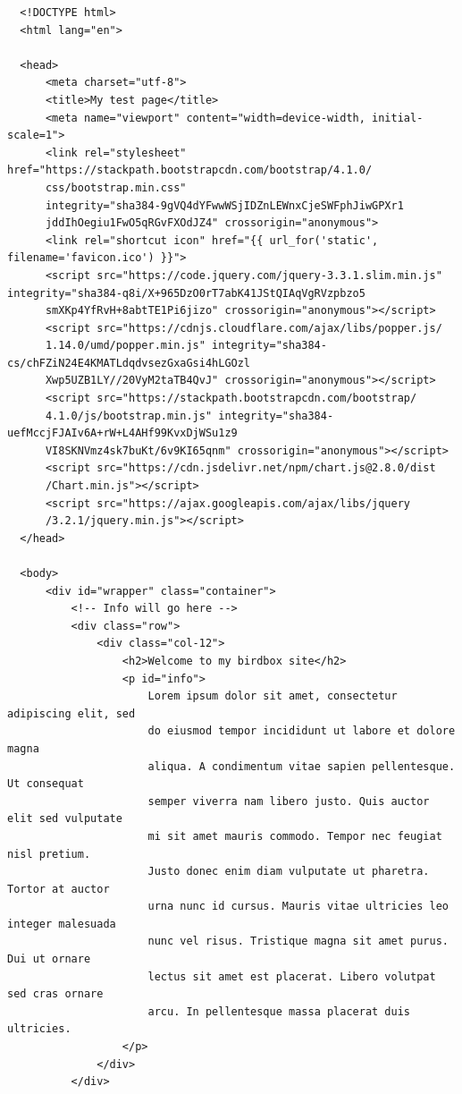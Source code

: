 \documentclass[10pt,a4paper]{article}
\begin{document}
\begin{verbatim}
  <!DOCTYPE html>
  <html lang="en">

  <head>
      <meta charset="utf-8">
      <title>My test page</title>
      <meta name="viewport" content="width=device-width, initial-scale=1">
      <link rel="stylesheet" href="https://stackpath.bootstrapcdn.com/bootstrap/4.1.0/
      css/bootstrap.min.css"
      integrity="sha384-9gVQ4dYFwwWSjIDZnLEWnxCjeSWFphJiwGPXr1
      jddIhOegiu1FwO5qRGvFXOdJZ4" crossorigin="anonymous">
      <link rel="shortcut icon" href="{{ url_for('static', filename='favicon.ico') }}">
      <script src="https://code.jquery.com/jquery-3.3.1.slim.min.js" integrity="sha384-q8i/X+965DzO0rT7abK41JStQIAqVgRVzpbzo5
      smXKp4YfRvH+8abtTE1Pi6jizo" crossorigin="anonymous"></script>
      <script src="https://cdnjs.cloudflare.com/ajax/libs/popper.js/
      1.14.0/umd/popper.min.js" integrity="sha384-cs/chFZiN24E4KMATLdqdvsezGxaGsi4hLGOzl
      Xwp5UZB1LY//20VyM2taTB4QvJ" crossorigin="anonymous"></script>
      <script src="https://stackpath.bootstrapcdn.com/bootstrap/
      4.1.0/js/bootstrap.min.js" integrity="sha384-uefMccjFJAIv6A+rW+L4AHf99KvxDjWSu1z9
      VI8SKNVmz4sk7buKt/6v9KI65qnm" crossorigin="anonymous"></script>
      <script src="https://cdn.jsdelivr.net/npm/chart.js@2.8.0/dist
      /Chart.min.js"></script>
      <script src="https://ajax.googleapis.com/ajax/libs/jquery
      /3.2.1/jquery.min.js"></script>
  </head>

  <body>
      <div id="wrapper" class="container">
          <!-- Info will go here -->
          <div class="row">
              <div class="col-12">
                  <h2>Welcome to my birdbox site</h2>
                  <p id="info">
                      Lorem ipsum dolor sit amet, consectetur adipiscing elit, sed
                      do eiusmod tempor incididunt ut labore et dolore magna
                      aliqua. A condimentum vitae sapien pellentesque. Ut consequat
                      semper viverra nam libero justo. Quis auctor elit sed vulputate
                      mi sit amet mauris commodo. Tempor nec feugiat nisl pretium.
                      Justo donec enim diam vulputate ut pharetra. Tortor at auctor
                      urna nunc id cursus. Mauris vitae ultricies leo integer malesuada
                      nunc vel risus. Tristique magna sit amet purus. Dui ut ornare
                      lectus sit amet est placerat. Libero volutpat sed cras ornare
                      arcu. In pellentesque massa placerat duis ultricies.
                  </p>
              </div>
          </div>


\end{verbatim}
\end{document}
